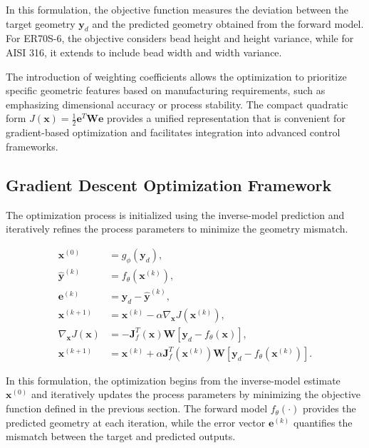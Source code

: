 \documentclass[11pt]{article}
\begin{document}
In this formulation, the objective function measures the deviation between the target geometry $\mathbf{y}_d$ and the predicted geometry obtained from the forward model. For ER70S-6, the objective considers bead height and height variance, while for AISI 316, it extends to include bead width and width variance. 

The introduction of weighting coefficients allows the optimization to prioritize specific geometric features based on manufacturing requirements, such as emphasizing dimensional accuracy or process stability. The compact quadratic form $J(\mathbf{x}) = \frac{1}{2}\mathbf{e}^T \mathbf{W}\mathbf{e}$ provides a unified representation that is convenient for gradient-based optimization and facilitates integration into advanced control frameworks.

\subsection{Gradient Descent Optimization Framework}\label{Gradient Descent Optimization Framework}

The optimization process is initialized using the inverse-model prediction and iteratively refines the process parameters to minimize the geometry mismatch.

\begin{tcolorbox}[colback=white,colframe=black,boxrule=0.5pt,arc=2pt]
\begin{equation}
\begin{aligned}
\mathbf{x}^{(0)} &= g_{\phi}(\mathbf{y}_{d}), \\
\hat{\mathbf{y}}^{(k)} &= f_{\theta}(\mathbf{x}^{(k)}), \\
\mathbf{e}^{(k)} &= \mathbf{y}_{d} - \hat{\mathbf{y}}^{(k)}, \\
\mathbf{x}^{(k+1)} &= \mathbf{x}^{(k)} - \alpha \nabla_{\mathbf{x}} J(\mathbf{x}^{(k)}), \\
\nabla_{\mathbf{x}} J(\mathbf{x}) &= -\mathbf{J}_{f}^{T}(\mathbf{x}) \mathbf{W} \left[\mathbf{y}_{d} - f_{\theta}(\mathbf{x})\right], \\
\mathbf{x}^{(k+1)} &= \mathbf{x}^{(k)} + \alpha \mathbf{J}_{f}^{T}(\mathbf{x}^{(k)}) \mathbf{W} \left[\mathbf{y}_{d} - f_{\theta}(\mathbf{x}^{(k)})\right].
\end{aligned}
\end{equation}
\end{tcolorbox}

In this formulation, the optimization begins from the inverse-model estimate $\mathbf{x}^{(0)}$ and iteratively updates the process parameters by minimizing the objective function defined in the previous section. The forward model $f_{\theta}(\cdot)$ provides the predicted geometry at each iteration, while the error vector $\mathbf{e}^{(k)}$ quantifies the mismatch between the target and predicted outputs.
\end{document}
